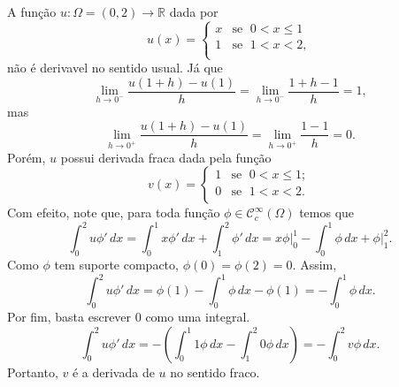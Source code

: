 \documentclass[a4paper, 11pt]{book}
\theoremstyle{definition}
\newcommand{\bR}{\mathbb{R}}
\newcommand{\cC}{\mathcal{C}}
\begin{document}
\begin{ex} \label{ex:derivada-fraca-R}
    A função $u : \Omega  =(0,2) \to \bR$ dada por
    \[
        u(x) = \left\{
            \begin{array}{rl}
                x & \text{se }\; 0 < x \leqslant 1\\
                1 & \text{se }\; 1 < x < 2,\\
            \end{array}
        \right.
    \]
    não é derivavel no sentido usual. Já que
    \[
        \lim_{h\to 0^-} \frac{u(1 + h) - u(1)}{h} = \lim_{h \to 0^-} \frac{1 + h -1}{h} = 1,
    \]
    mas
    \[
        \lim_{h\to 0^+} \frac{u(1 + h) - u(1)}{h} = \lim_{h \to 0^+} \frac{1 -1}{h} = 0.
    \]
    Porém, $u$ possui derivada fraca dada pela função
    \[
        v(x) = \left\{
            \begin{array}{rl}
                1 & \text{se }\; 0 < x \leqslant 1;\\
                0 & \text{se }\; 1 < x < 2.\\
            \end{array}
        \right.
    \]
    Com efeito, note que, para toda função $\phi \in \cC^\infty_c(\Omega)$ temos que
    \[
        \int_0^2 u \phi' \,dx = \int_0^1 x \phi' \,dx + \int_1^2 \phi' \,dx = x \phi \bigg|_0^1 - \int_0^1 \phi \,dx + \phi \bigg|_1^2.
    \]
    Como $\phi$ tem suporte compacto, $\phi(0) = \phi(2) = 0$. Assim,
    \[
        \int_0^2 u \phi' \,dx = \phi(1) - \int_0^1 \phi \,dx - \phi(1) = -\int_0^1 \phi \,dx.
    \]
    Por fim, basta escrever $0$ como uma integral.
    \[
        \int_0^2 u \phi' \,dx = - \left(  \int_0^1 1\phi \, dx - \int_1^2 0\phi \,dx  \right) = -\int_0^2 v \phi \,dx.
    \]
    Portanto, $v$ é a derivada de $u$ no sentido fraco.
\end{ex}
\end{document}
